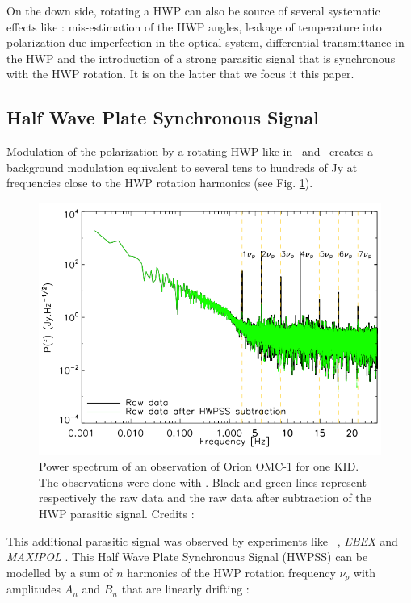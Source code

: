 On the down side, rotating a HWP can also be source of several systematic effects like : mis-estimation of the HWP angles, leakage of temperature into polarization due imperfection in the optical system, differential transmittance in the HWP \citep{2009MNRAS.397..634B,2018SPIE10708E..48S} and the introduction of a strong parasitic signal that is synchronous with the HWP rotation. It is on the latter that we focus it this paper.

\subsection{Half Wave Plate Synchronous Signal}

Modulation of the polarization by a rotating HWP like in \nika\ and \nikad\ creates a background modulation equivalent to several tens to hundreds of Jy at frequencies close to the HWP rotation harmonics \citep{2017A&A...599A..34R} (see Fig. \ref{fig:hwp_power_spectrum}).

\begin{figure}[h]
\center
\includegraphics[clip, angle=0, width=\columnwidth]{Figures/hwp_power_spectrum.png}
\caption{Power spectrum of an observation of Orion OMC-1 for one KID. The observations were done with \nika . Black and green lines represent respectively the raw data and the raw data after subtraction of the HWP parasitic signal. Credits : \citet{2017A&A...599A..34R} }
\label{fig:hwp_power_spectrum}
\end{figure}

This additional parasitic signal was observed by experiments like \ , \emph{EBEX} \citep{2010SPIE.7741E..1CR} and \emph{MAXIPOL} \citep{2007ApJ...665...42J}. This Half Wave Plate Synchronous Signal (HWPSS) can be modelled by a sum of $n$ harmonics of the HWP rotation frequency $\nu_{p}$ with amplitudes $A_{n}$ and $B_{n}$ that are linearly drifting :


